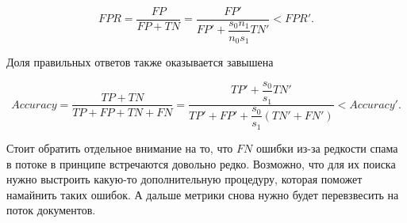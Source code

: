 \documentclass[12pt, a4paper, oneside]{article}
\begin{document}
\[
FPR = \frac{FP}{FP + TN} = \frac{FP'}{FP' + \dfrac{s_0 n_1}{n_0 s_1} TN'} < FPR'.
\]

Доля правильных ответов также оказывается завышена

\[
Accuracy = \frac{TP + TN}{TP + FP + TN +FN} = \frac{TP' + \dfrac{s_0}{s_1} TN'}{TP' + FP' + \dfrac{s_0}{s_1}\left( TN' + FN' \right)} < Accuracy'.
\]

Стоит обратить отдельное внимание на то, что $FN$ ошибки из-за редкости спама в потоке в принципе встречаются довольно редко. Возможно, что для их поиска нужно выстроить какую-то дополнительную процедуру, которая поможет намайнить таких ошибок. А дальше метрики снова нужно будет перевзвесить на поток документов. 



\end{document}
